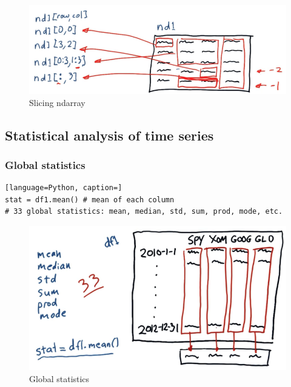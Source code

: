 \documentclass[12pt]{article}
\begin{document}
\begin{figure}[!ht]
\centering
\includegraphics[scale=0.45]{fig/fig8}
\caption{Slicing ndarray}
\end{figure}

\subsection{Statistical analysis of time series}

\subsubsection{Global statistics}
\begin{lstlisting}[language=Python, caption=]
stat = df1.mean() # mean of each column
# 33 global statistics: mean, median, std, sum, prod, mode, etc.
\end{lstlisting}

\begin{figure}[!ht]
\centering
\includegraphics[scale=0.45]{fig/fig9}
\caption{Global statistics}
\end{figure}
\end{document}
